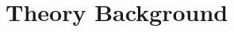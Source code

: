 \renewcommand{\relPath}{SECTION/20_Theory}
\chapter[Theory]{Theory Background}\label{ch:theory}




